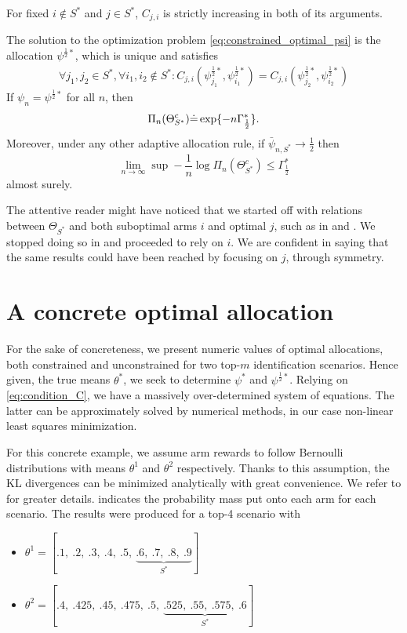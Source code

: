 \begin{lemma}\label{lemma:C_strictly_increasing}
  For fixed $i \notin S^*$ and $j \in S^*$, $C_{j, i}$ is strictly increasing
  in both of its arguments.
\end{lemma}

\begin{proposition}\label{proposition:characterization}
  The solution to the optimization problem \ref{eq:constrained_optimal_psi} is
  the allocation $\psi^{\frac{1}{2}*}$, which is unique and satisfies
  \begin{align}
    \forall j_1, j_2 \in S^*, \forall i_1, i_2 \notin S^*:
    C_{j, i}(\psi^{\frac{1}{2}*}_{j_1}, \psi^{\frac{1}{2}*}_{i_1})
    = C_{j, i}(\psi^{\frac{1}{2}*}_{j_2}, \psi^{\frac{1}{2}*}_{i_2})
    \label{eq:condition_C}
  \end{align}
  If $\psi_n = \psi^{\frac{1}{2}*}$ for all $n$, then
  \[\Pi_n(\Theta_{S^*}^c) \dot{=} \exp \{-n\Gamma^*_{\frac{1}{2}}\}.\]
  Moreover, under any other adaptive allocation rule, if $\bar{\psi}_{n, S^*}
  \rightarrow \frac{1}{2}$ then
  \[\lim_{n \rightarrow \infty} \sup - \frac{1}{n} \log \Pi_n(\Theta^c_{S^*})
      \leq \Gamma^*_{\frac{1}{2}}\]
  almost surely.
\end{proposition}

The attentive reader might have noticed that we started off with relations between $\Theta_{S^*}$ and both suboptimal arms $i$ and optimal $j$, such as in  and . We stopped doing so in  and proceeded to rely on $i$. We are confident in saying that the same results could have been reached by focusing on $j$, through symmetry.

\section{A concrete optimal allocation}
    \label{section:concrete_optimal_allocation}
For the sake of concreteness, we present numeric values of optimal allocations,
both constrained and unconstrained for two top-$m$ identification scenarios.
Hence given, the true means $\theta^*$, we seek to determine $\psi^*$ and
$\psi^{\frac{1}{2}*}$. Relying on \eqref{eq:condition_C}, we have a massively
over-determined system of equations. The latter can be approximately solved by
numerical methods, in our case non-linear least squares minimization.

For this concrete example, we assume arm rewards to follow Bernoulli
distributions with means $\theta^1$ and $\theta^2$ respectively. Thanks to this
assumption, the KL divergences can be minimized analytically with great
convenience. We refer to  for greater details.
 indicates the probability mass put onto each arm
for each scenario. The results were produced for a top-4 scenario with
\begin{itemize}
  \item $\theta^1 = [.1,\ .2,\ .3,\ .4,\ .5,\ \underbrace{.6,\ .7,\ .8,\
      .9}_\text{$S^*$}]$
  \item $\theta^2 = [.4,\ .425,\ .45,\ .475,\ .5,\ \underbrace{.525,\ .55,\
      .575,\ .6}_\text{$S^*$}]$
\end{itemize}

